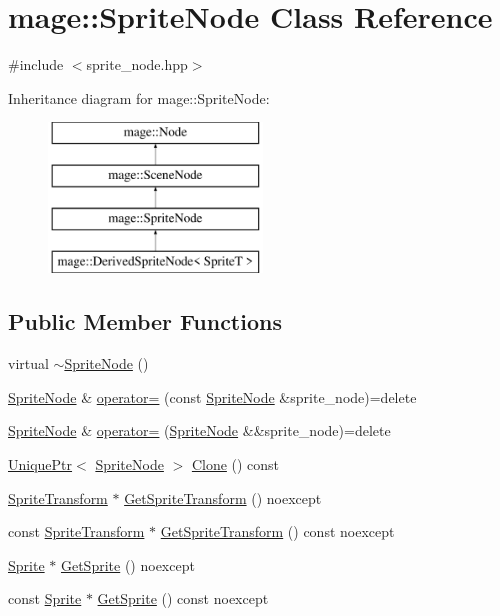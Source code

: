 \hypertarget{classmage_1_1_sprite_node}{}\section{mage\+:\+:Sprite\+Node Class Reference}
\label{classmage_1_1_sprite_node}


{\ttfamily \#include $<$sprite\+\_\+node.\+hpp$>$}

Inheritance diagram for mage\+:\+:Sprite\+Node\+:\begin{figure}[H]
\begin{center}
\leavevmode
\includegraphics[height=4.000000cm]{classmage_1_1_sprite_node}
\end{center}
\end{figure}
\subsection*{Public Member Functions}
\begin{DoxyCompactItemize}
\item 
virtual \hyperlink{classmage_1_1_sprite_node_a04ada795f035b935af9992a6b7a75959}{$\sim$\+Sprite\+Node} ()
\item 
\hyperlink{classmage_1_1_sprite_node}{Sprite\+Node} \& \hyperlink{classmage_1_1_sprite_node_a009228c9f53671a4275534ceb7733bd0}{operator=} (const \hyperlink{classmage_1_1_sprite_node}{Sprite\+Node} \&sprite\+\_\+node)=delete
\item 
\hyperlink{classmage_1_1_sprite_node}{Sprite\+Node} \& \hyperlink{classmage_1_1_sprite_node_a908ba50d10d6573e913a8c2d785c7d69}{operator=} (\hyperlink{classmage_1_1_sprite_node}{Sprite\+Node} \&\&sprite\+\_\+node)=delete
\item 
\hyperlink{namespacemage_a3316d7143a973e37adf1110f2e80ca31}{Unique\+Ptr}$<$ \hyperlink{classmage_1_1_sprite_node}{Sprite\+Node} $>$ \hyperlink{classmage_1_1_sprite_node_a16481829a3796abd5afe5ce0c9ebf578}{Clone} () const
\item 
\hyperlink{structmage_1_1_sprite_transform}{Sprite\+Transform} $\ast$ \hyperlink{classmage_1_1_sprite_node_a99d90a2a337a45c0623022756c53f214}{Get\+Sprite\+Transform} () noexcept
\item 
const \hyperlink{structmage_1_1_sprite_transform}{Sprite\+Transform} $\ast$ \hyperlink{classmage_1_1_sprite_node_a021d8d7d51a05330bfa6d034482988a0}{Get\+Sprite\+Transform} () const noexcept
\item 
\hyperlink{classmage_1_1_sprite}{Sprite} $\ast$ \hyperlink{classmage_1_1_sprite_node_a84806dd38c94900f0fabf0163a706370}{Get\+Sprite} () noexcept
\item 
const \hyperlink{classmage_1_1_sprite}{Sprite} $\ast$ \hyperlink{classmage_1_1_sprite_node_a585276a679d83576464014eeb156cf10}{Get\+Sprite} () const noexcept
\end{DoxyCompactItemize}
